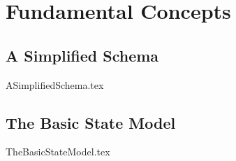 %
%
%
\chapter{Fundamental Concepts}
\label{intro} %


\section{A Simplified Schema}
\label{sec:01:1}
{ASimplifiedSchema.tex}

\section{The Basic State Model}
\label{sec:01:2}
{TheBasicStateModel.tex}



